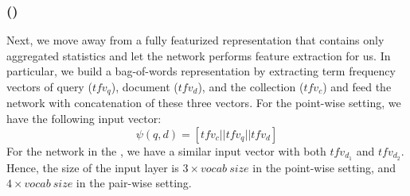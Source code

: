 \subsubsection{\Feedtwo (\ftwo)} 
Next, we move away from a fully featurized representation that contains only aggregated statistics and let the network performs feature extraction for us. In particular, we build a bag-of-words representation by extracting term frequency vectors of query ($tfv_q$), document ($tfv_d$), and the collection ($tfv_c$) and feed the network with concatenation of these three vectors. For the point-wise setting, we have the following input vector:
\begin{equation}
\psi(q, d) = [tfv_c || tfv_q || tfv_d]
\end{equation}
For the network in the \modelthree, we have a similar input vector with both $tfv_{d_1}$ and $tfv_{d_2}$. Hence, the size of the input layer is $3 \times vocab~size$ in the point-wise setting, and $4 \times vocab~size$ in the pair-wise setting. 

